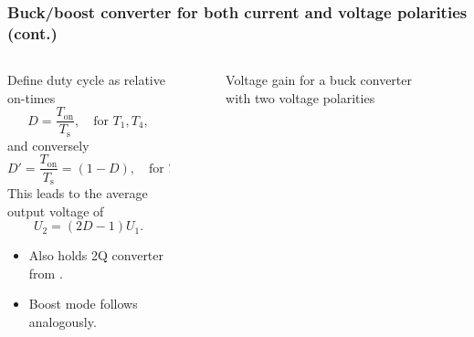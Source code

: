 \begin{frame}
    \frametitle{Buck/boost converter for both current and voltage polarities (cont.)}
    \begin{columns}
        \begin{column}{0.5\textwidth}
            Define duty cycle as relative on-times
            $$ D = \frac{T_\mathrm{on}}{T_\mathrm{s}}, \quad \mbox{for } T_1, T_4,
            $$
            and conversely
            $$
            D' = \frac{T_\mathrm{on}}{T_\mathrm{s}}=(1-D), \quad \mbox{for } T_2, T_3.
            $$
        This leads to the average output voltage of
        \begin{equation}
            U_2 = (2D-1) U_1.
        \end{equation}

        \begin{itemize}
            \item<3-> Also holds 2Q converter from .
            \item<4-> Boost mode follows analogously.
        \end{itemize}
        \end{column}
        \begin{column}{0.5\textwidth}
            \begin{figure}
                \caption{Voltage gain for a buck converter with two voltage polarities}
                \label{fig:DCDC-input-output-voltage-two-voltage-pol}
            \end{figure}
        \end{column}
    \end{columns}
\end{frame}

